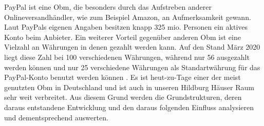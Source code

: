 PayPal ist eine \ac{Obm}, die besonders durch das Aufstreben anderer Onlineversandhändler, wie zum Beispiel Amazon, an Aufmerksamkeit gewann. Laut PayPals eigenen Angaben besitzen knapp 325 mio. Personen ein aktives Konto beim Anbieter. Ein weiterer Vorteil gegenüber anderen Obm ist eine Vielzahl an Währungen in denen gezahlt werden kann. Auf den Stand März 2020 liegt diese Zahl bei 100 verschiedenen Währungen, während nur 56 ausgezahlt werden können und nur 25 verschiedene Währungen als Standartwährung für das PayPal-Konto benutzt werden können \cite{PayPala}. Es ist heut-zu-Tage einer der meist genutzten \cite{poleshova} Obm in Deutschland und ist auch in unseren Hildburg Häuser Raum sehr weit verbreitet. Aus diesem Grund werden die Grundstrukturen, deren daraus entstandene Entwicklung und den daraus folgenden Einfluss analysieren und dementsprechend auswerten.
